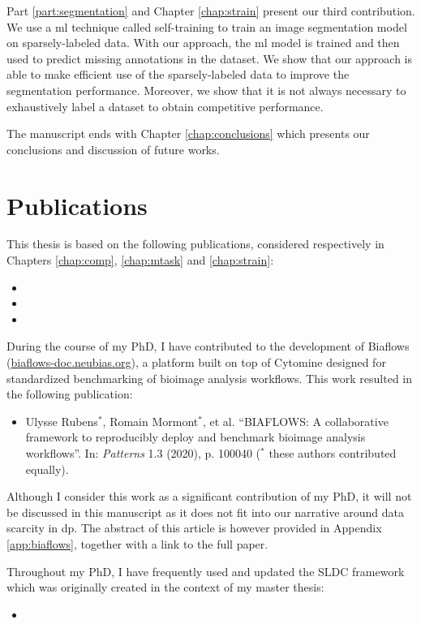 Part \ref{part:segmentation} and Chapter \ref{chap:strain} present our third contribution. We use a \acrlong{ml} technique called self-training to train an image segmentation model on sparsely-labeled data. With our approach, the \acrlong{ml} model is trained and then used to predict missing annotations in the dataset. We show that our approach is able to make efficient use of the sparsely-labeled data to improve the segmentation performance. Moreover, we show that it is not always necessary to exhaustively label a dataset to obtain competitive performance. 

The manuscript ends with Chapter \ref{chap:conclusions} which presents our conclusions and discussion of future works.

\section{Publications}

This thesis is based on the following publications, considered respectively in Chapters \ref{chap:comp}, \ref{chap:mtask} and \ref{chap:strain}:
\begin{itemize}
  \item {}
  \item {}
  \item {}
\end{itemize}

During the course of my PhD, I have contributed to the development of Biaflows (\url{biaflows-doc.neubias.org}), a platform built on top of Cytomine designed for standardized benchmarking of bioimage analysis workflows. This work resulted in the following publication: 
\begin{itemize}
  \item Ulysse Rubens$^\ast$, Romain Mormont$^\ast$, et al. ``BIAFLOWS: A collaborative framework to reproducibly deploy and benchmark bioimage analysis workflows''. In: \textit{Patterns}  1.3 (2020), p. 100040 ($^\ast$ these authors contributed equally).
\end{itemize}
Although I consider this work as a significant contribution of my PhD, it will not be discussed in this manuscript as it does not fit into our narrative around data scarcity in \acrlong{dp}. The abstract of this article is however provided in Appendix \ref{app:biaflows}, together with a link to the full paper. 

Throughout my PhD, I have frequently used and updated the SLDC framework which was originally created in the context of my master thesis:
\begin{itemize}
  \item {}
\end{itemize}

